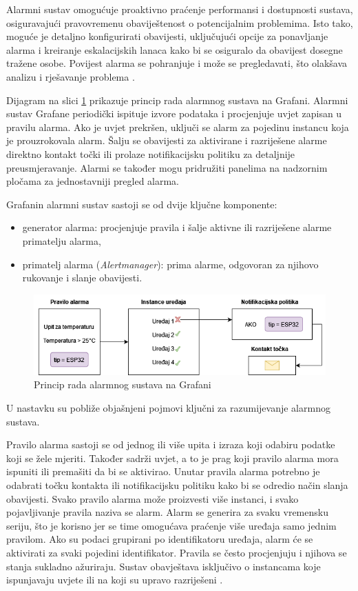 Alarmni sustav omogućuje proaktivno praćenje performansi i dostupnosti sustava, osiguravajući pravovremenu obaviještenost o potencijalnim problemima. Isto tako, moguće je detaljno konfigurirati obavijesti, uključujući opcije za ponavljanje alarma i kreiranje eskalacijskih lanaca kako bi se osiguralo da obavijest dosegne tražene osobe. Povijest alarma se pohranjuje i može se pregledavati, što olakšava analizu i rješavanje problema \cite{grafana}. 

Dijagram na slici \ref{fig:alerting_system} prikazuje princip rada alarmnog sustava na Grafani. Alarmni sustav Grafane periodički ispituje izvore podataka i procjenjuje uvjet zapisan u pravilu alarma. Ako je uvjet prekršen, uključi se alarm za pojedinu instancu koja je prouzrokovala alarm. Šalju se obavijesti za aktivirane i razriješene alarme direktno kontakt točki ili prolaze notifikacijsku politiku za detaljnije preusmjeravanje. Alarmi se također mogu pridružiti panelima na nadzornim pločama za jednostavniji pregled alarma. 

Grafanin alarmni sustav sastoji se od dvije ključne komponente:
\begin{itemize}
	\item generator alarma: procjenjuje pravila i šalje aktivne ili razriješene alarme primatelju alarma, 
	\item primatelj alarma (\textit{Alertmanager}): prima alarme, odgovoran za njihovo rukovanje i slanje obavijesti.
\end{itemize}

\begin{figure}[ht]
	\centering
	\includegraphics[scale=0.6]{imgs/alerting_system}
	\caption{Princip rada alarmnog sustava na Grafani \cite{grafana}}
	\label{fig:alerting_system}
\end{figure}

U nastavku su pobliže objašnjeni pojmovi ključni za razumijevanje alarmnog sustava.

Pravilo alarma  sastoji se od jednog ili više upita i izraza koji odabiru podatke koji se žele mjeriti. Također sadrži uvjet, a to je prag koji pravilo alarma mora ispuniti ili premašiti da bi se aktivirao. Unutar pravila alarma potrebno je odabrati točku kontakta ili notifikacijsku politiku kako bi se odredio način slanja obavijesti. Svako pravilo alarma može proizvesti više instanci, i svako pojavljivanje pravila naziva se alarm. Alarm se generira za svaku vremensku seriju, što je korisno jer se time omogućava praćenje više uređaja samo jednim pravilom. Ako su podaci grupirani po identifikatoru uređaja, alarm će se aktivirati za svaki pojedini identifikator. Pravila se često procjenjuju i njihova se stanja sukladno ažuriraju. Sustav obavještava isključivo o instancama koje ispunjavaju uvjete ili na koji su upravo razriješeni . 

